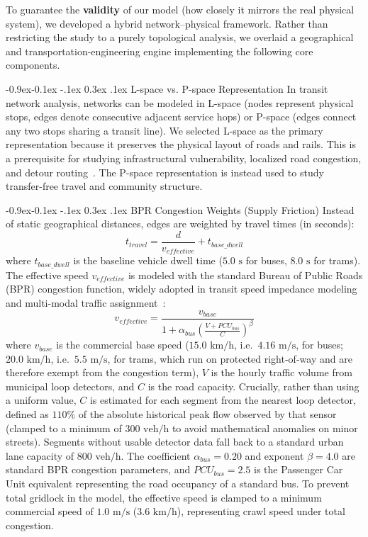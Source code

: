 \documentclass[12pt, a4paper]{article}
\makeatletter
\renewcommand\subsection{\@startsection{subsection}{2}{\z@}%
                                     {-0.9ex\@plus -0.1ex \@minus -.1ex}%
                                     {0.3ex \@plus .1ex}%
                                     {\normalfont\large\bfseries}}
\makeatother
\begin{document}
To guarantee the \textbf{validity} of our model (how closely it mirrors the real physical system), we developed a hybrid network--physical framework. Rather than restricting the study to a purely topological analysis, we overlaid a geographical and transportation-engineering engine implementing the following core components.

\subsection{L-space vs. P-space Representation}
In transit network analysis, networks can be modeled in L-space (nodes represent physical stops, edges denote consecutive adjacent service hops) or P-space (edges connect any two stops sharing a transit line). We selected L-space as the primary representation because it preserves the physical layout of roads and rails. This is a prerequisite for studying infrastructural vulnerability, localized road congestion, and detour routing~\cite{derrible}. The P-space representation is instead used to study transfer-free travel and community structure.

\subsection{BPR Congestion Weights (Supply Friction)}
Instead of static geographical distances, edges are weighted by travel times (in seconds):
$$t_{travel} = \frac{d}{v_{effective}} + t_{base\_dwell}$$
where $t_{base\_dwell}$ is the baseline vehicle dwell time ($5.0\text{ s}$ for buses, $8.0\text{ s}$ for trams). The effective speed $v_{effective}$ is modeled with the standard Bureau of Public Roads (BPR) congestion function, widely adopted in transit speed impedance modeling and multi-modal traffic assignment~\cite{ryu, pi}:
$$v_{effective} = \frac{v_{base}}{1 + \alpha_{bus} \left( \frac{V + PCU_{bus}}{C} \right)^\beta}$$
where $v_{base}$ is the commercial base speed ($15.0\text{ km/h}$, i.e.\ $4.16\text{ m/s}$, for buses; $20.0\text{ km/h}$, i.e.\ $5.5\text{ m/s}$, for trams, which run on protected right-of-way and are therefore exempt from the congestion term), $V$ is the hourly traffic volume from municipal loop detectors, and $C$ is the road capacity. Crucially, rather than using a uniform value, $C$ is estimated for each segment from the nearest loop detector, defined as $110\%$ of the absolute historical peak flow observed by that sensor (clamped to a minimum of $300\text{ veh/h}$ to avoid mathematical anomalies on minor streets). Segments without usable detector data fall back to a standard urban lane capacity of $800\text{ veh/h}$. The coefficient $\alpha_{bus}=0.20$ and exponent $\beta=4.0$ are standard BPR congestion parameters, and $PCU_{bus} = 2.5$ is the Passenger Car Unit equivalent representing the road occupancy of a standard bus. To prevent total gridlock in the model, the effective speed is clamped to a minimum commercial speed of $1.0\text{ m/s}$ ($3.6\text{ km/h}$), representing crawl speed under total congestion.
\end{document}
